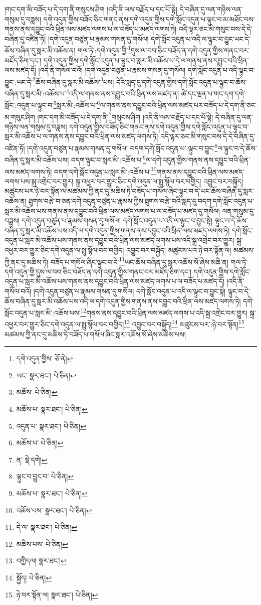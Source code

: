 །གང་དག་མི་བཟོད་པ་དེ་དག་ནི་གསུངས་ཤིག །འདི་ནི་ལས་བརྗོད་པ་དང་པོ་སྟེ། དེ་བཞིན་དུ་ལན་གཉིས་ལན་གསུམ་དུ་བཟླས། དགེ་འདུན་གྱིས་བཟོད་ཅིང་གནང་ནས་དགེ་འདུན་གྱིས་དགེ་སློང་འདུན་པ་ལྟུང་བ་མ་མཐོང་བས་གནས་ནས་དབྱུང་བའི་ཕྲིན་ལས་མཛད་ལགས་པ་ལ་བཟོད་པ་མཛད་ལགས་ཏེ། འདི་ལྟར་ཅང་མི་གསུང་བས་དེ་དེ་བཞིན་དུ་འཛིན་ཏོ། །དགེ་འདུན་བཙུན་པ་རྣམས་གསན་དུ་གསོལ། དགེ་སློང་འདུན་པ་འདི་ལ་ལྟུང་བ་བྱུང་ཡང་དེ་ཆོས་བཞིན་དུ་སླར་མི་འཆོས་ན། གལ་ཏེ་:དགེ་འདུན་གྱི་\footnote{དགེ་འདུན་གྱིས་  ཅོ་ནེ། }དུས་ལ་བབ་ཅིང་བཟོད་ན་དགེ་འདུན་གྱིས་གནང་བར་མཛོད་ཅིག་དང་། དགེ་འདུན་གྱིས་དགེ་སློང་འདུན་པ་ལྟུང་བ་སླར་མི་འཆོས་པ་དེ་ལ་གནས་ནས་དབྱུང་བའི་ཕྲིན་ལས་མཛད་དོ། །འདི་ནི་གསོལ་བའོ། །དགེ་འདུན་བཙུན་པ་རྣམས་གསན་དུ་གསོལ། དགེ་སློང་འདུན་པ་འདི་ལྟུང་བ་བྱུང་:ཡང་དེ་\footnote{ཡང་  སྣར་ཐང་།  པེ་ཅིན། }ཆོས་བཞིན་དུ་སླར་མི་འཆོས་\footnote{མཆོས་  པེ་ཅིན། }པས། དེའི་སླད་དུ་དགེ་འདུན་གྱིས་དགེ་སློང་འདུན་པ་ལྟུང་བ་ཆོས་བཞིན་དུ་སླར་མི་:འཆོས་པ་\footnote{མཆོས་པ་  སྣར་ཐང་།  པེ་ཅིན། }འདི་ལ་གནས་ནས་དབྱུང་བའི་ཕྲིན་ལས་མཛད་ན། ཚེ་དང་ལྡན་པ་གང་དག་དགེ་སློང་:འདུན་པ་ལྟུང་བ་\footnote{འདུན་པ་  སྣར་ཐང་།  པེ་ཅིན། }སླར་མི་:འཆོས་པ་\footnote{མཆོས་པ་  པེ་ཅིན། }ལ་གནས་ནས་དབྱུང་བའི་ཕྲིན་ལས་མཛད་པར་བཟོད་པ་དེ་དག་ནི་ཅང་མ་གསུང་ཤིག །གང་དག་མི་བཟོད་པ་དེ་དག་ནི་\footnote{ན་  སྡེ་དགེ། }གསུངས་ཤིག །འདི་ནི་ལས་བརྗོད་པ་དང་པོ་སྟེ། དེ་བཞིན་དུ་ལན་གཉིས་ལན་གསུམ་དུ་བཟླས། དགེ་འདུན་གྱིས་བཟོད་ཅིང་གནང་ནས་དགེ་འདུན་གྱིས་དགེ་སློང་འདུན་པ་ལྟུང་བ་སླར་མི་འཆོས་པ་ལ་གནས་ནས་དབྱུང་བའི་ཕྲིན་ལས་མཛད་ལགས་ཏེ། འདི་ལྟར་ཅང་མི་གསུང་བས་དེ་དེ་བཞིན་དུ་འཛིན་ཏོ། །དགེ་འདུན་བཙུན་པ་རྣམས་གསན་དུ་གསོལ། བདག་དགེ་སློང་འདུན་པ་:ལྟུང་བ་བྱུང་\footnote{ལྟུང་བ་བྱུང་བ་  པེ་ཅིན། }ལ་ལྟུང་བ་དེ་ཆོས་བཞིན་དུ་སླར་མི་འཆོས་པས། བདག་ལྟུང་བ་སླར་མི་:འཆོས་པ་\footnote{མཆོས་པ་  སྣར་ཐང་།  པེ་ཅིན། }ལ་དགེ་འདུན་གྱིས་གནས་ནས་དབྱུང་བའི་ཕྲིན་ལས་མཛད་ལགས་ཏེ། བདག་དགེ་སློང་འདུན་པ་སླར་མི་:འཆོས་པ་\footnote{འཆོས་པས་  སྣར་ཐང་།  པེ་ཅིན། }གནས་ནས་དབྱུང་བའི་ཕྲིན་ལས་མཛད་ལགས་པས་སྐྲ་འགྲེང་བར་གྱུར། སྐྲ་འཕྱར་བར་གྱུར་ཅིང་དགེ་འདུན་ལ་སྤུ་སྙོལ་བར་བགྱིད། འབྱུང་བར་བསྐྱོད། མཚུངས་པར་ཉེ་བར་སྟོན་ལ་མཚམས་ཀྱི་ནང་དུ་མཆིས་ཏེ་བཟོད་པ་གསོལ་ཞིང་ལྟུང་བ་དེ་ཡང་ཆོས་བཞིན་དུ་སླར་འཆོས་ན། ཐུགས་བརྩེ་བ་ཅན་དགེ་འདུན་བཙུན་པ་རྣམས་ཀྱིས་ཐུགས་བརྩེ་བའི་སླད་དུ་བདག་དགེ་སློང་འདུན་པ་སླར་མི་འཆོས་པས་གནས་ནས་དབྱུང་བའི་ཕྲིན་ལས་མཛད་ལགས་པ་ལ་བཟོད་པ་མཛད་དུ་གསོལ། ལན་གསུམ་དུ་བཟླས། དགེ་འདུན་བཙུན་པ་རྣམས་གསན་དུ་གསོལ། དགེ་སློང་འདུན་པ་འདི་ལ་ལྟུང་བ་བྱུང་སྟེ། ལྟུང་བ་དེ་ཆོས་བཞིན་དུ་སླར་མི་འཆོས་པས་འདི་ལ་དགེ་འདུན་གྱིས་གནས་ནས་དབྱུང་བའི་ཕྲིན་ལས་མཛད་ལགས་ཏེ། དགེ་སློང་འདུན་པ་སླར་མི་འཆོས་པས་གནས་ནས་དབྱུང་བའི་ཕྲིན་ལས་མཛད་ལགས་པས་འདི་སྐྲ་འགྲེང་བར་གྱུར། སྐྲ་འཕྱར་བར་གྱུར་ཅིང་དགེ་འདུན་ལ་སྤུ་སྙོལ་བར་བགྱིད། འབྱུང་བར་བསྐྱོད། མཚུངས་པར་ཉེ་བར་སྟོན་ལ། མཚམས་ཀྱི་ནང་དུ་མཆིས་ཏེ། བཟོད་པ་གསོལ་ཞིང་ལྟུང་བ་དེ་\footnote{དེ་ལ་  སྣར་ཐང་།  པེ་ཅིན། }ཡང་ཆོས་བཞིན་དུ་སླར་འཆོས་སོ་ཞེས་མཆི་ན། གལ་ཏེ་དགེ་འདུན་གྱི་དུས་ལ་བབ་ཅིང་བཟོད་ན་དགེ་འདུན་གྱིས་གནང་བར་མཛོད་ཅིག་དང་། དགེ་འདུན་གྱིས་དགེ་སློང་འདུན་པ་སླར་མི་འཆོས་པས་གནས་ནས་དབྱུང་བའི་ཕྲིན་ལས་མཛད་ལགས་པ་ལ་བཟོད་པ་མཛད་དོ། །འདི་ནི་གསོལ་བའོ། །དགེ་འདུན་བཙུན་པ་རྣམས་གསན་དུ་གསོལ། དགེ་སློང་འདུན་པ་འདི་ལ་ལྟུང་བ་བྱུང་སྟེ། ལྟུང་བ་དེ་ཆོས་བཞིན་དུ་སླར་མི་འཆོས་པས་འདི་ལ་དགེ་འདུན་གྱིས་གནས་ནས་དབྱུང་བའི་ཕྲིན་ལས་མཛད་ལགས་ཏེ། དགེ་སློང་འདུན་པ་སླར་མི་:འཆོས་པས་\footnote{མཆིས་པས་  པེ་ཅིན། }གནས་ནས་དབྱུང་བའི་ཕྲིན་ལས་མཛད་ལགས་པ་འདི་སྐྲ་འགྲེང་བར་གྱུར། སྐྲ་འཕྱར་བར་གྱུར་ཅིང་དགེ་འདུན་ལ་སྤུ་སྙོལ་བར་བགྱིད།\footnote{བགྱིདལ།  སྣར་ཐང་། } འབྱུང་བར་བསྐྱོད།\footnote{སྐྱོད།  པེ་ཅིན། } མཚུངས་པར་:ཉེ་བར་སྟོན།\footnote{ཉེ་བར་སྟོན་ལ།  སྣར་ཐང་།  པེ་ཅིན། } མཚམས་ཀྱི་ནང་དུ་མཆིས་ཏེ་བཟོད་པ་གསོལ་ཞིང་སླར་འཆོས་སོ་ཞེས་མཆིས་པས། 